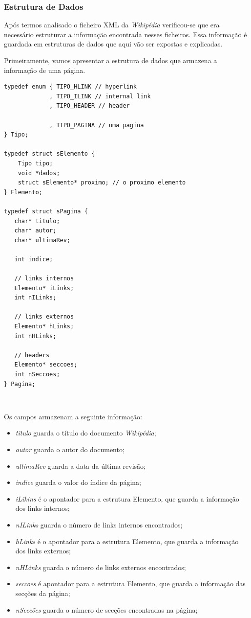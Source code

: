 \documentclass[11pt, a4paper, oneside]{article}
\begin{document}
\subsubsection{Estrutura de Dados}

Após termos analisado o ficheiro XML da \textit{Wikipédia} verificou-se que era necessário estruturar a informação encontrada nesses ficheiros. Essa informação é guardada em estruturas de dados que aqui vão ser expostas e explicadas. 

Primeiramente, vamos apresentar a estrutura de dados que armazena a informação de uma página.
\begin{verbatim}
typedef enum { TIPO_HLINK // hyperlink
             , TIPO_ILINK // internal link
             , TIPO_HEADER // header

             , TIPO_PAGINA // uma pagina
} Tipo;

typedef struct sElemento {
    Tipo tipo;
    void *dados;
    struct sElemento* proximo; // o proximo elemento
} Elemento;

typedef struct sPagina {
   char* titulo;
   char* autor;
   char* ultimaRev;

   int indice;

   // links internos
   Elemento* iLinks;
   int nILinks;

   // links externos
   Elemento* hLinks;
   int nHLinks;
   
   // headers
   Elemento* seccoes;
   int nSeccoes;
} Pagina;

\end{verbatim}\


Os campos armazenam a seguinte informação:
\begin{itemize}

\item \textit{titulo} guarda o título do documento \textit{Wikipédia};
\item \textit{autor} guarda o autor do documento;
\item \textit{ultimaRev} guarda a data da última revisão;
\item \textit{indice} guarda o valor do índice da página;
\item \textit{iLikins} é o apontador para a estrutura Elemento, que guarda a informação dos links internos;
\item \textit{nILinks} guarda o número de links internos encontrados;
\item \textit{hLinks} é o apontador para a estrutura Elemento, que guarda a informação dos links externos;
\item \textit{nHLinks} guarda o número de links externos encontrados;
\item \textit{seccoes} é apontador para a estrutura Elemento, que guarda a informação das secções da página;
\item \textit{nSeccões} guarda o número de secções encontradas na página;


\newpage
\end{itemize}
\end{document}
